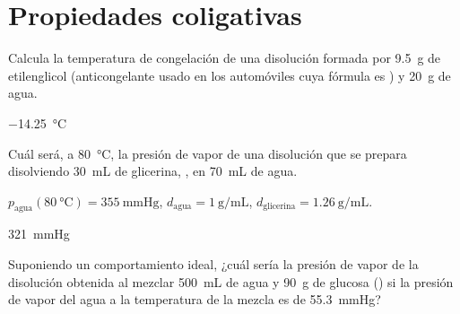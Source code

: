 \section{Propiedades coligativas}

\begin{exercise}[
    tags    = {termodinámica, entalpía, entalpia de reacción, calor},
    topics  = {química, termoquímica, termodinámica},
    source  = {FQ 1B OXF 2015, p79, e41},
  ]
  Calcula la temperatura de congelación de una disolución formada por \SI{9.5}{\gram} de etilenglicol (anticongelante usado en los automóviles cuya fórmula es ) y \SI{20}{\gram} de agua.
\end{exercise}

\begin{solution}
  \SI{-14,25}{\celsius}
\end{solution}



\begin{exercise}[
    tags    = {termodinámica, entalpía, entalpia de reacción, calor},
    topics  = {química, termoquímica, termodinámica},
    source  = {FQ 1B SAN 2015, p94, e51},
  ]
  Cuál será, a \SI{80}{\celsius}, la presión de vapor de una disolución que se prepara disolviendo \SI{30}{\milli\liter} de glicerina, , en \SI{70}{\milli\liter} de agua.

  \begin{gexdatos}
    \( p_{\mathrm{agua}}(\SI{80}{\celsius}) = \SI{355}{\mmHg} \),
    \( d_{\mathrm{agua}} = \SI{1}{\gram\per\milli\liter} \),
    \( d_{\mathrm{glicerina}} = \SI{1.26}{\gram\per\milli\liter} \). %
  \end{gexdatos}
\end{exercise}

\begin{solution}
  \SI{321}{\mmHg}
\end{solution}




\begin{exercise}[
    tags    = {termodinámica, entalpía, entalpia de reacción, calor},
    topics  = {química, termoquímica, termodinámica},
    source  = {FQ 1B OXF 2015, p79, e44},
  ]
  Suponiendo un comportamiento ideal, ¿cuál sería la presión de vapor de la disolución obtenida al mezclar \SI{500}{\milli\liter} de agua y \SI{90}{\gram} de glucosa () si la presión de vapor del agua a la temperatura de la mezcla es de \SI{55.3}{\mmHg}?
\end{exercise}

